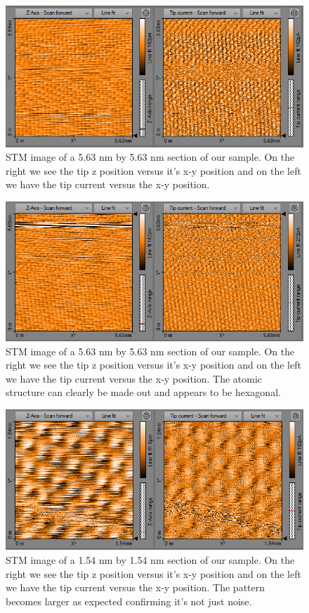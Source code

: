 \documentclass{article}
\begin{document}
\begin{figure}[H]
\includegraphics[scale=.8,center]{STM5d63nm2.PNG}
\caption{STM image of a 5.63 nm by 5.63 nm section of our sample.  On the right we see the tip z position versus it's x-y position and on the left we have the tip current versus the x-y position.}
\end{figure}

\begin{figure}[H]
\includegraphics[scale=.8,center]{STM5d63nm22.PNG}
\caption{STM image of a 5.63 nm by 5.63 nm section of our sample.  On the right we see the tip z position versus it's x-y position and on the left we have the tip current versus the x-y position.  The atomic structure can clearly be made out and appears to be hexagonal.}
\end{figure}

\begin{figure}[H]
\includegraphics[scale=.8,center]{STM1d54nm2.PNG}
\caption{STM image of a 1.54 nm by 1.54 nm section of our sample.  On the right we see the tip z position versus it's x-y position and on the left we have the tip current versus the x-y position.  The pattern becomes larger as expected confirming it's not just noise.}
\end{figure}
\end{document}
